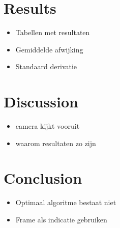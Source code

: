 \documentclass[a4paper]{article}
\begin{document}
\newpage 
\section{Results}
\begin{itemize}
\item Tabellen met resultaten
\item Gemiddelde afwijking
\item Standaard derivatie
\end{itemize}

\newpage
\section{Discussion}
\begin{itemize}
\item camera kijkt vooruit
\item waarom resultaten zo zijn
\end{itemize}

\newpage
\section{Conclusion}
\begin{itemize}
\item Optimaal algoritme bestaat niet
\item Frame als indicatie gebruiken
\end{itemize}
\end{document}
